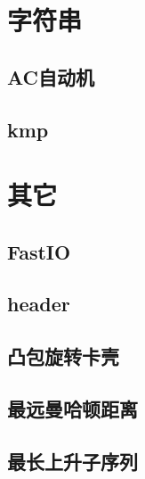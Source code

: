 \documentclass[twocolumn,a4,twoside]{article}
\begin{document}
	
	\section{字符串}
		\subsection{AC自动机}
		
		\subsection{kmp}
		
		
	\section{其它}
		\subsection{FastIO}
		
		\subsection{header}
		
		\subsection{凸包旋转卡壳}
		
		\subsection{最远曼哈顿距离}
		
		\subsection{最长上升子序列}
		
\end{document}
